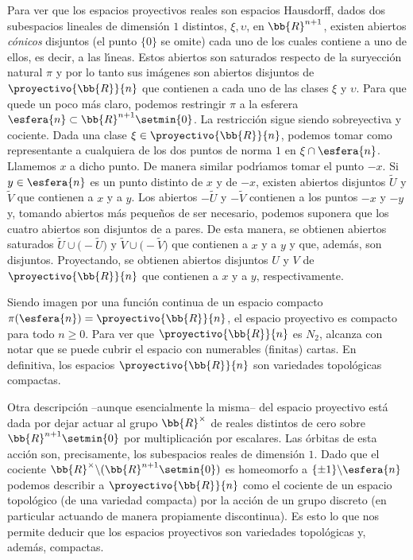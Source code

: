 \begin{ejemplo}
Para ver que los espacios proyectivos reales son espacios Hausdorff,
dados dos subespacios lineales de dimensi\'{o}n $1$ distintos, $\xi,\upsilon$,
en $\bb{R}^{n+1}$, existen abiertos \emph{c\'{o}nicos} disjuntos (el punto
$\{0\}$ se omite) cada uno de los cuales contiene a uno de ellos, es decir,
a las l\'{\i}neas. Estos abiertos son saturados respecto de la suryecci\'{o}n
natural $\pi$ y por lo tanto sus im\'{a}genes son abiertos disjuntos de
$\proyectivo{\bb{R}}{n}$ que contienen a cada uno de las clases $\xi$ y
$\upsilon$. Para que quede un poco m\'{a}s claro, podemos restringir $\pi$ a
la esferera $\esfera{n}\subset\bb{R}^{n+1}\setmin\{0\}$. La restricci\'{o}n
sigue siendo sobreyectiva y cociente. Dada una clase
$\xi\in\proyectivo{\bb{R}}{n}$, podemos tomar como representante a cualquiera
de los dos puntos de norma $1$ en $\xi\cap\esfera{n}$. Llamemos $x$ a dicho
punto. De manera similar podr\'{\i}amos tomar el punto $-x$. Si
$y\in\esfera{n}$ es un punto distinto de $x$ y de $-x$, existen abiertos
disjuntos $\widetilde{U}$ y $\widetilde{V}$ que contienen a $x$ y a $y$.
Los abiertos $-\widetilde{U}$ y $-\widetilde{V}$ contienen a los puntos
$-x$ y $-y$ y, tomando abiertos m\'{a}s peque\~{n}os de ser necesario, podemos
suponera que los cuatro abiertos son disjuntos de a pares. De esta manera,
se obtienen abiertos saturados $\widetilde{U}\cup\big(-\widetilde{U}\big)$
y $\widetilde{V}\cup\big(-\widetilde{V}\big)$ que contienen a $x$ y a $y$ y
que, adem\'{a}s, son disjuntos. Proyectando, se obtienen abiertos disjuntos
$U$ y $V$ de $\proyectivo{\bb{R}}{n}$ que contienen a $x$ y a $y$,
respectivamente.

Siendo imagen por una funci\'{o}n continua de un espacio compacto
$\pi(\esfera{n})=\proyectivo{\bb{R}}{n}$, el espacio proyectivo
es compacto para todo $n\geq 0$. Para ver que $\proyectivo{\bb{R}}{n}$ es
$N_{2}$, alcanza con notar que se puede cubrir el espacio con numerables
(finitas) cartas. En definitiva, los espacios $\proyectivo{\bb{R}}{n}$ son
variedades topol\'{o}gicas compactas.

Otra descripci\'{o}n --aunque esencialmente la misma-- del espacio
proyectivo est\'{a} dada por dejar actuar al grupo $\bb{R}^{\times}$
de reales distintos de cero sobre $\bb{R}^{n+1}\setmin\{0\}$ por
multiplicaci\'{o}n por escalares. Las \'{o}rbitas de esta acci\'{o}n son,
precisamente, los subespacios reales de dimensi\'{o}n $1$. Dado que el
cociente $\bb{R}^{\times}\backslash(\bb{R}^{n+1}\setmin\{0\})$ es homeomorfo
a $\{\pm1\}\backslash\esfera{n}$ podemos describir a $\proyectivo{\bb{R}}{n}$
como el cociente de un espacio topol\'{o}gico (de una variedad compacta) por
la acci\'{o}n de un grupo discreto (en particular actuando de manera
propiamente discontinua). Es esto lo que nos permite deducir que los
espacios proyectivos son variedades topol\'{o}gicas y, adem\'{a}s, compactas.
\end{ejemplo}

